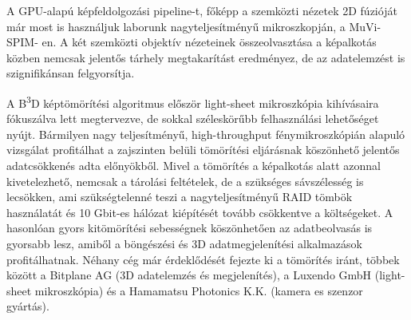 \documentclass{booklet_style}
\def\b3d{B\textsuperscript{3}D}
\begin{document}
A GPU-alapú képfeldolgozási pipeline-t, főképp a szemközti nézetek 2D fúzióját már most is használjuk laborunk nagyteljesítményű mikroszkopján, a MuVi-SPIM- en. A két szemközti objektív nézeteinek összeolvasztása a képalkotás közben nemcsak jelentős tárhely megtakarítást eredményez, de az adatelemzést is szignifikánsan felgyorsítja.

A \b3d képtömörítési algoritmus először light-sheet mikroszkópia kihívásaira fókuszálva lett megtervezve, de sokkal széleskörűbb felhasználási lehetőséget nyújt. Bármilyen nagy teljesítményű, high-throughput fénymikroszkópián alapuló vizsgálat profitálhat a zajszinten belüli tömörítési eljárásnak köszönhető jelentős adatcsökkenés adta előnyökből. Mivel a tömörítés a képalkotás alatt azonnal kivetelezhető, nemcsak a tárolási feltételek, de a szükséges sávszélesség is lecsökken, ami szükségtelenné teszi a nagyteljesítményű RAID tömbök használatát és 10 Gbit-es hálózat kiépítését tovább csökkentve a költségeket. A hasonlóan gyors kitömörítési sebességnek köszönhetően az
adatbeolvasás is gyorsabb lesz, amiből a böngészési és 3D adatmegjelenítési alkalmazások profitálhatnak. Néhany cég már érdeklődését fejezte ki a tömörítés iránt, többek között a Bitplane AG (3D adatelemzés és megjelenítés), a Luxendo GmbH (light-sheet mikroszkópia) és a Hamamatsu Photonics K.K. (kamera es szenzor gyártás).





\printbibliography[category=journal, title={A szerző közleményei a témában}, heading=secbib]

\nocite{jakus_genetic_2010,gyorffy_recurrenceonline:_2011,shi_combined_2014}
\printbibliography[category=others, title={A szerző további közleményei}, heading=secbib, resetnumbers=5]

\printbibliography[category=conference, title={A szerző konferencia előadásai}, heading=secbib]

\newrefcontext
\printbibliography[notcategory=journal,notcategory=conference,notcategory=others, resetnumbers=true, title={Referenciák}, heading=secbib]


\end{document}
